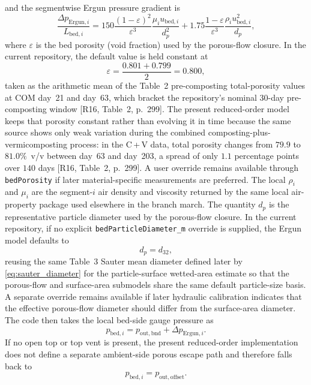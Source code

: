 \documentclass[11pt]{article}
\newcommand{\code}[1]{\nolinkurl{#1}}
\begin{document}
and the segmentwise Ergun pressure gradient is
\begin{equation}
\label{eq:ergun_segment_pressure_gradient}
\frac{\Delta p_{\mathrm{Ergun},i}}{L_{\mathrm{bed},i}}=
150\frac{(1-\varepsilon)^2}{\varepsilon^3}\frac{\mu_i u_{\mathrm{bed},i}}{d_p^2}
+
1.75\frac{1-\varepsilon}{\varepsilon^3}\frac{\rho_i u_{\mathrm{bed},i}^2}{d_p},
\end{equation}
where \(\varepsilon\) is the bed porosity (void fraction) used by the porous-flow closure. In the current repository, the default value is held constant at
\[
\varepsilon=\frac{0.801+0.799}{2}=0.800,
\]
taken as the arithmetic mean of the Table~2 pre-composting total-porosity values at COM day~21 and day~63, which bracket the repository's nominal 30-day pre-composting window [R16, Table~2, p.~299]. The present reduced-order model keeps that porosity constant rather than evolving it in time because the same source shows only weak variation during the combined composting-plus-vermicomposting process: in the C\,+\,V data, total porosity changes from \(79.9\) to \(81.0\%\)~v/v between day~63 and day~203, a spread of only \(1.1\) percentage points over \(140\) days [R16, Table~2, p.~299]. A user override remains available through \code{bedPorosity} if later material-specific measurements are preferred. The local \(\rho_i\) and \(\mu_i\) are the segment-\(i\) air density and viscosity returned by the same local air-property package used elsewhere in the branch march. The quantity \(d_p\) is the representative particle diameter used by the porous-flow closure. In the current repository, if no explicit \code{bedParticleDiameter\_m} override is supplied, the Ergun model defaults to
\[
d_p=d_{32},
\]
reusing the same Table~3 Sauter mean diameter defined later by \eqref{eq:sauter_diameter} for the particle-surface wetted-area estimate so that the porous-flow and surface-area submodels share the same default particle-size basis. A separate override remains available if later hydraulic calibration indicates that the effective porous-flow diameter should differ from the surface-area diameter.
The code then takes the local bed-side gauge pressure as
\begin{equation}
\label{eq:bed_pressure_closure}
p_{\mathrm{bed},i}=p_{\mathrm{out,bnd}}+\Delta p_{\mathrm{Ergun},i}.
\end{equation}
If no open top or top vent is present, the present reduced-order implementation does not define a separate ambient-side porous escape path and therefore falls back to
\[
p_{\mathrm{bed},i}=p_{\mathrm{out,offset}}.
\]
\end{document}
